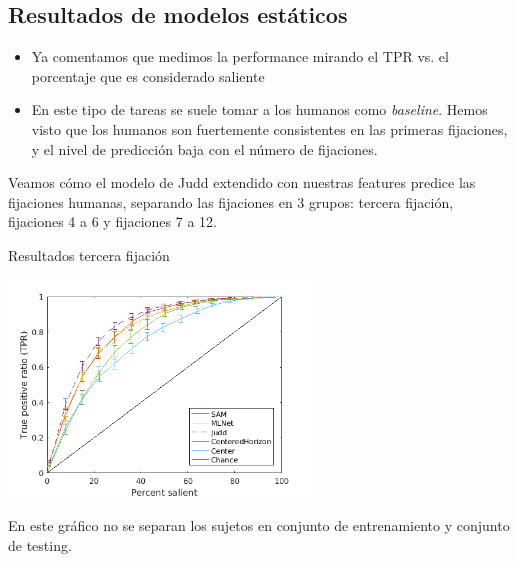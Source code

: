 \documentclass[compress]{beamer}
\begin{document}


\subsection{Resultados de modelos estáticos}
\begin{frame}
\begin{itemize}
\item Ya comentamos que medimos la performance mirando el TPR vs. el porcentaje que es considerado saliente
\item En este tipo de tareas se suele tomar a los humanos como \textit{baseline}. Hemos visto que los humanos son fuertemente consistentes en las primeras fijaciones, y el nivel de predicción baja con el número de fijaciones.
\end{itemize}

\bigskip
Veamos cómo el modelo de Judd extendido con nuestras features predice las fijaciones humanas, separando las fijaciones en 3 grupos: tercera fijación, fijaciones 4 a 6 y fijaciones 7 a 12.

\end{frame}

\begin{frame}{Resultados tercera fijación}
\begin{center}
\includegraphics[width=0.6\textwidth]{images/results_fix_3_to_3_all.png} 
\end{center}

{\footnotesize En este gráfico no se separan los sujetos en conjunto de entrenamiento y conjunto de testing. }
\end{frame}
\end{document}
